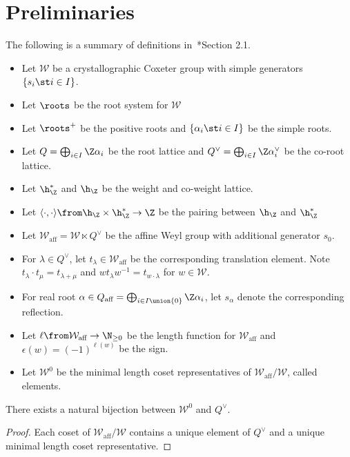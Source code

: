 \documentclass[11pt,leqno,oneside]{amsart}
\numberwithin{thm}{section}
\renewcommand{\W}{\mathcal{W}}
\newcommand{\Waff}{\W_{\text{aff}}}
\begin{document}
\section{Preliminaries}\label{preliminaries}
\begin{defn}
  The following is a summary of definitions in~\cite{lam}*{Section 2.1}.
  \begin{itemize}
  \item Let \(\W\) be a crystallographic Coxeter group with simple
    generators \(\{s_i \st i \in I\}\).
  \item Let \(\roots\) be the root system for \(\W\)
  \item Let \(\roots^+\) be the positive roots and \(\{\alpha_i \st i
    \in I\}\) be the simple roots.
  \item Let \(Q = \bigoplus_{i \in I} \Z \alpha_i\) be the root
    lattice and \(Q^\vee = \bigoplus_{i \in I} \Z \alpha_i^\vee\) be
    the co-root lattice.
  \item Let \(\h_\Z^*\) and \(\h_\Z\) be the weight and co-weight
    lattice.
  \item Let \(\langle \cdot, \cdot \rangle \from \h_\Z \times \h_\Z^*
    \to \Z\) be the pairing between \(\h_\Z\) and \(\h_\Z^*\)
  \item Let \(\Waff = \W \ltimes Q^\vee\) be the affine Weyl group with
    additional generator \(s_0\).
  \item For \(\lambda \in Q^\vee\), let \(t_\lambda \in \Waff\) be the
    corresponding translation element. Note \(t_\lambda \cdot t_\mu =
    t_{\lambda+\mu}\) and \(w t_\lambda w^{-1} = t_{w \cdot \lambda}\)
    for \(w \in \W\).
  \item For real root \(\alpha \in Q_{\text{aff}} = \bigoplus_{i \in I
    \union \{0\}} \Z \alpha_i\), let \(s_\alpha\) denote the
  corresponding reflection.
  \item Let \(\ell \from \Waff \to \N_{\geq 0}\) be the length
    function for \(\Waff\) and \(\epsilon(w) = (-1)^{\ell(w)}\) be the
    sign. 
  \item Let \(\W^0\) be the minimal length coset representatives of
    \(\Waff/\W\), called  elements. 
  \end{itemize}
\end{defn}
\begin{prop}
  There exists a natural bijection between \(\W^0\) and \(Q^\vee\).
\end{prop}
\begin{proof}
  Each coset of \(\Waff/\W\) contains a unique element of \(Q^\vee\)
  and a unique minimal length coset representative.
\end{proof}
\end{document}
